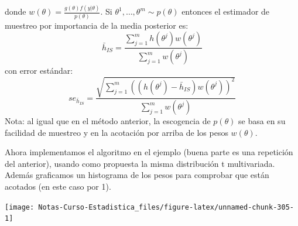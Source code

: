 \documentclass[
  12pt,
]{book}
\newenvironment{Shaded}{\begin{snugshade}}{\end{snugshade}}
\newcommand{\AttributeTok}[1]{\textcolor[rgb]{0.77,0.63,0.00}{#1}}
\newcommand{\ConstantTok}[1]{\textcolor[rgb]{0.00,0.00,0.00}{#1}}
\newcommand{\DecValTok}[1]{\textcolor[rgb]{0.00,0.00,0.81}{#1}}
\newcommand{\FunctionTok}[1]{\textcolor[rgb]{0.00,0.00,0.00}{#1}}
\newcommand{\NormalTok}[1]{#1}
\newcommand{\OtherTok}[1]{\textcolor[rgb]{0.56,0.35,0.01}{#1}}
\newcommand{\SpecialCharTok}[1]{\textcolor[rgb]{0.00,0.00,0.00}{#1}}
\begin{document}
donde \(w(\theta)=\frac{g(\theta)f(y|\theta)}{p(\theta)}\). Si
\(\theta^1,\ldots,\theta^{m}\sim p(\theta)\) entonces el estimador de
muestreo por importancia de la media posterior es:
\[\bar h_{IS}=\frac{\sum_{j=1}^mh(\theta^j)w(\theta^j)}{\sum_{j=1}^mw(\theta^j)}\]
con error estándar:
\[se_{\bar h_{IS}}=\frac{\sqrt{\sum_{j=1}^m((h(\theta^j)-\bar h_{IS})w(\theta^j))^2}}{\sum_{j=1}^mw(\theta^j)}\]
Nota: al igual que en el método anterior, la escogencia de \(p(\theta)\)
se basa en su facilidad de muestreo y en la acotación por arriba de los
pesos \(w(\theta)\).

Ahora implementamos el algoritmo en el ejemplo (buena parte es una
repetición del anterior), usando como propuesta la misma distribución t
multivariada. Además graficamos un histograma de los pesos para
comprobar que están acotados (en este caso por 1).

\begin{Shaded}
\end{Shaded}

\begin{center}\texttt{[image: Notas-Curso-Estadistica\_files/figure-latex/unnamed-chunk-305-1]} \end{center}
\end{document}
